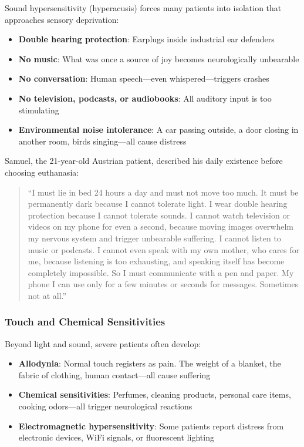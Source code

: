 Sound hypersensitivity (hyperacusis) forces many patients into isolation that approaches sensory deprivation:

\begin{itemize}
    \item \textbf{Double hearing protection}: Earplugs inside industrial ear defenders
    \item \textbf{No music}: What was once a source of joy becomes neurologically unbearable
    \item \textbf{No conversation}: Human speech---even whispered---triggers crashes
    \item \textbf{No television, podcasts, or audiobooks}: All auditory input is too stimulating
    \item \textbf{Environmental noise intolerance}: A car passing outside, a door closing in another room, birds singing---all cause distress
\end{itemize}

Samuel, the 21-year-old Austrian patient, described his daily existence before choosing euthanasia:

\begin{quote}
``I must lie in bed 24 hours a day and must not move too much. It must be permanently dark because I cannot tolerate light. I wear double hearing protection because I cannot tolerate sounds. I cannot watch television or videos on my phone for even a second, because moving images overwhelm my nervous system and trigger unbearable suffering. I cannot listen to music or podcasts. I cannot even speak with my own mother, who cares for me, because listening is too exhausting, and speaking itself has become completely impossible. So I must communicate with a pen and paper. My phone I can use only for a few minutes or seconds for messages. Sometimes not at all.''
\end{quote}

\subsubsection{Touch and Chemical Sensitivities}

Beyond light and sound, severe patients often develop:

\begin{itemize}
    \item \textbf{Allodynia}: Normal touch registers as pain. The weight of a blanket, the fabric of clothing, human contact---all cause suffering
    \item \textbf{Chemical sensitivities}: Perfumes, cleaning products, personal care items, cooking odors---all trigger neurological reactions
    \item \textbf{Electromagnetic hypersensitivity}: Some patients report distress from electronic devices, WiFi signals, or fluorescent lighting
\end{itemize}


